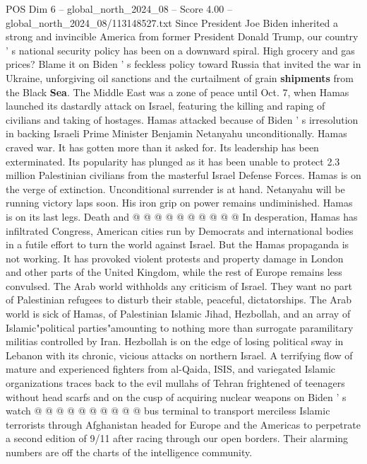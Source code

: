 \begin{textsample}{POS Dim 6 – global\_north\_2024\_08 – Score 4.00 – global\_north\_2024\_08/113148527.txt}  \label{ex:f6_pos_300}
Since President Joe Biden inherited a strong and invincible America from former President Donald Trump, our country ' s national security policy has been on a downward spiral.
High grocery and gas prices?
Blame it on Biden ' s feckless policy toward Russia that invited the war in Ukraine, unforgiving oil sanctions and the curtailment of grain \textbf{shipments} from the Black \textbf{Sea}.
The Middle East was a zone of peace until Oct. 7, when Hamas launched its dastardly attack on Israel, featuring the killing and raping of civilians and taking of hostages.
Hamas attacked because of Biden ' s irresolution in backing Israeli Prime Minister Benjamin Netanyahu unconditionally.
Hamas craved war.
It has gotten more than it asked for.
Its leadership has been exterminated.
Its popularity has plunged as it has been unable to protect 2.3 million Palestinian civilians from the masterful Israel Defense Forces.
Hamas is on the verge of extinction.
Unconditional surrender is at hand.
Netanyahu will be running victory laps soon.
His iron grip on power remains undiminished.
Hamas is on its last legs.
Death and @ @ @ @ @ @ @ @ @ @ In desperation, Hamas has infiltrated Congress, American cities run by Democrats and international bodies in a futile effort to turn the world against Israel.
But the Hamas propaganda is not working.
It has provoked violent protests and property damage in London and other parts of the United Kingdom, while the rest of Europe remains less convulsed.
The Arab world withholds any criticism of Israel.
They want no part of Palestinian refugees to disturb their stable, peaceful, dictatorships.
The Arab world is sick of Hamas, of Palestinian Islamic Jihad, Hezbollah, and an array of Islamic"political parties"amounting to nothing more than surrogate paramilitary militias controlled by Iran.
Hezbollah is on the edge of losing political sway in Lebanon with its chronic, vicious attacks on northern Israel.
A terrifying flow of mature and experienced fighters from al-Qaida, ISIS, and variegated Islamic organizations traces back to the evil mullahs of Tehran frightened of teenagers without head scarfs and on the cusp of acquiring nuclear weapons on Biden ' s watch @ @ @ @ @ @ @ @ @ @ bus terminal to transport merciless Islamic terrorists through Afghanistan headed for Europe and the Americas to perpetrate a second edition of 9/11 after racing through our open borders.
Their alarming numbers are off the charts of the intelligence community.

\end{textsample}

